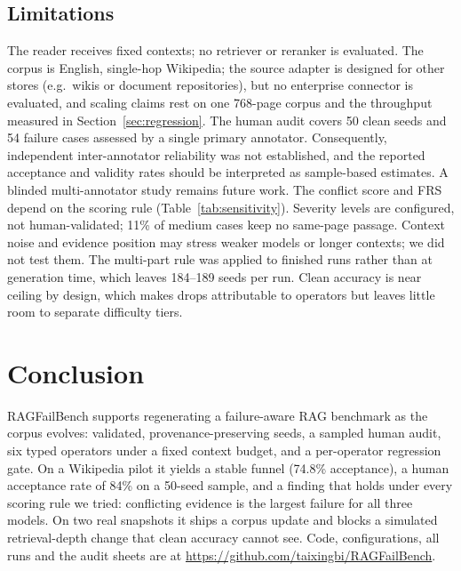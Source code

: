 \documentclass[conference]{IEEEtran}
\newcommand{\op}[1]{\texttt{\detokenize{#1}}}
\begin{document}
\subsection{Limitations}
The reader receives fixed contexts; no retriever or reranker is evaluated. The corpus is
English, single-hop Wikipedia; the source adapter is designed for other stores (e.g.\ wikis or
document repositories), but no enterprise connector is evaluated, and scaling claims rest on one
768-page corpus and the throughput measured in Section~\ref{sec:regression}. The human audit covers 50 clean seeds and 54 failure cases assessed by a single primary
annotator. Consequently, independent inter-annotator reliability was not established, and the
reported acceptance and validity rates should be interpreted as sample-based estimates. A
blinded multi-annotator study remains future work. The conflict score and FRS
depend on the scoring rule (Table~\ref{tab:sensitivity}).
Severity levels are configured, not human-validated; 11\% of medium \op{missing_evidence} cases
keep no same-page passage. Context noise and evidence position may stress weaker models or
longer contexts; we did not test them. The multi-part rule was applied to finished runs rather
than at generation time, which leaves 184--189 seeds per run. Clean accuracy is near ceiling by
design, which makes drops attributable to operators but leaves little room to separate
difficulty tiers.

\section{Conclusion}
RAGFailBench supports regenerating a failure-aware RAG benchmark as the corpus evolves: validated,
provenance-preserving seeds, a sampled human audit, six typed operators under a fixed context
budget, and a per-operator regression gate. On a Wikipedia pilot it yields a stable funnel
(74.8\% acceptance), a human acceptance rate of 84\% on a 50-seed sample, and a finding that
holds under every scoring rule we tried: conflicting evidence is the largest failure for all
three models. On two real snapshots it ships a
corpus update and blocks a simulated retrieval-depth change that clean accuracy cannot see. Code,
configurations, all runs and the audit sheets are at
\url{https://github.com/taixingbi/RAGFailBench}.
\end{document}
